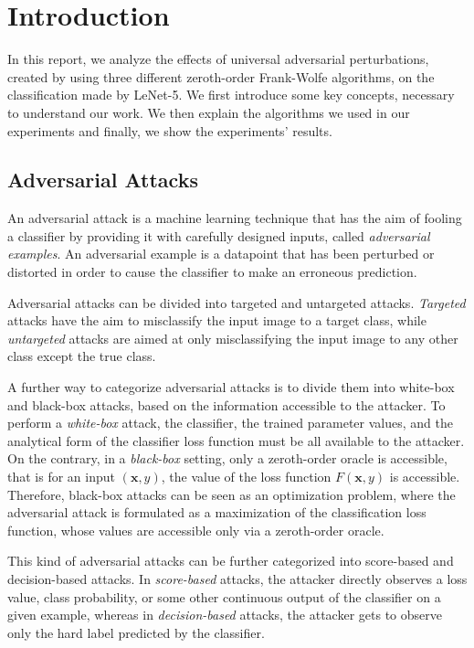 \section{Introduction}
In this report, we analyze the effects of universal adversarial perturbations, created by using three different
zeroth-order Frank-Wolfe algorithms, on the classification made by LeNet-5.
We first introduce some key concepts, necessary to understand our work. We then explain the algorithms we used in our
experiments and finally, we show the experiments' results.

\subsection{Adversarial Attacks}
An adversarial attack is a machine learning technique that has the aim of fooling a classifier by providing it with
carefully designed inputs, called \textit{adversarial examples}. An adversarial example is a datapoint that has
been perturbed or distorted in order to cause the classifier to make an erroneous prediction.

Adversarial attacks can be divided into targeted and untargeted attacks. \textit{Targeted} attacks have the aim to
misclassify the input image to a target class, while \textit{untargeted} attacks are aimed at only misclassifying
the input image to any other class except the true class.

A further way to categorize adversarial attacks is to divide them into white-box and black-box attacks, based on
the information accessible to the attacker. To perform a \textit{white-box} attack, the classifier, the trained
parameter values, and the analytical form of the classifier loss function must be all available to the attacker. On
the contrary, in a \textit{black-box} setting, only a zeroth-order oracle is accessible, that is for an input $(\mathbf{x},y)$,
the value of the loss function $F(\mathbf{x},y)$ is accessible. Therefore, black-box attacks can be seen as an optimization problem,
where the adversarial attack is formulated as a maximization of the classification loss function, whose values are
accessible only via a zeroth-order oracle.

This kind of adversarial attacks can be further categorized into score-based and decision-based attacks.
In \textit{score-based} attacks, the attacker directly observes a loss value, class probability, or some other
continuous output of the classifier on a given example, whereas in \textit{decision-based} attacks, the attacker gets to
observe only the hard label predicted by the classifier.

